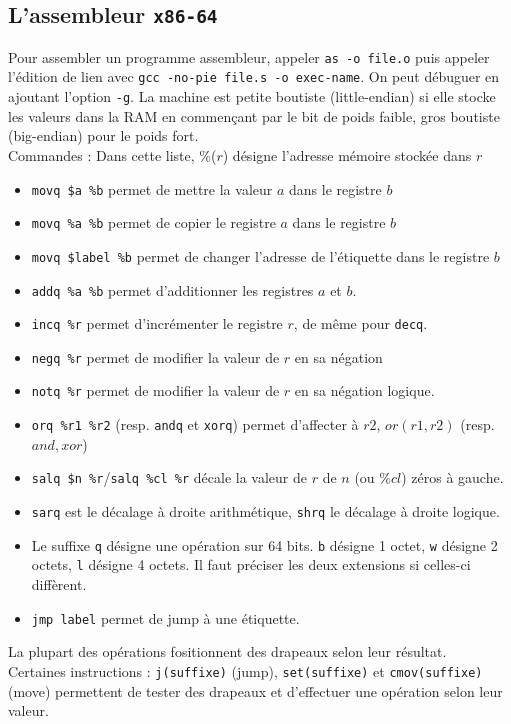\documentclass{cours}
\begin{document}
\subsection{L'assembleur \texttt{x86-64}}
Pour assembler un programme assembleur, appeler \texttt{as -o file.o} puis appeler l'édition de lien avec \texttt{gcc -no-pie file.s -o exec-name}. 
On peut débuguer en ajoutant l'option \texttt{-g}.
La machine est petite boutiste (little-endian) si elle stocke les valeurs dans la RAM en commençant par le bit de poids faible, gros boutiste (big-endian) pour le poids fort. \\
Commandes : Dans cette liste, \%($r$) désigne l'adresse mémoire stockée dans $r$
\begin{itemize}
    \item \texttt{movq \$a \%b} permet de mettre la valeur $a$ dans le registre $b$
    \item \texttt{movq \%a \%b} permet de copier le registre $a$ dans le registre $b$
    \item \texttt{movq \$label \%b} permet de changer l'adresse de l'étiquette dans le registre $b$
    \item \texttt{addq \%a \%b} permet d'additionner les registres $a$ et $b$. 
    \item \texttt{incq \%r} permet d'incrémenter le registre $r$, de même pour \texttt{decq}.
    \item \texttt{negq \%r} permet de modifier la valeur de $r$ en sa négation
    \item \texttt{notq \%r} permet de modifier la valeur de $r$ en sa négation logique.
    \item \texttt{orq \%r1 \%r2} (resp. \texttt{andq} et \texttt{xorq}) permet d'affecter à $r2$, $or(r1, r2)$ (resp. $and, xor$)
    \item \texttt{salq \$n \%r}/\texttt{salq \%cl \%r} décale la valeur de $r$ de $n$ (ou $\%cl$) zéros à gauche. 
    \item \texttt{sarq} est le décalage à droite arithmétique, \texttt{shrq} le décalage à droite logique. 
    \item Le suffixe \texttt{q} désigne une opération sur 64 bits. \texttt{b} désigne 1 octet, \texttt{w} désigne 2 octets, \texttt{l} désigne 4 octets. Il faut préciser les deux extensions si celles-ci diffèrent. 
    \item \texttt{jmp label} permet de jump à une étiquette.
\end{itemize}

La plupart des opérations fositionnent des drapeaux selon leur résultat.\\
Certaines instructions : \texttt{j(suffixe)} (jump), \texttt{set(suffixe)} et \texttt{cmov(suffixe)}(move) permettent de tester des drapeaux et d'effectuer une opération selon leur valeur.
\end{document}
